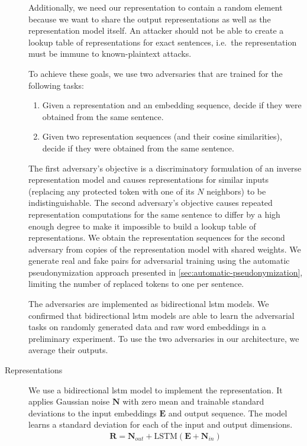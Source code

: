 \begin{description}
    Additionally, we need our representation to contain a random element because we want to share the output representations as well as the representation model itself.
    An attacker should not be able to create a lookup table of representations for exact sentences, i.e.\ the representation must be immune to known-plaintext attacks.
    
    To achieve these goals, we use two adversaries that are trained for the following tasks:
    \begin{enumerate}
        \item Given a representation and an embedding sequence, decide if they were obtained from the same sentence.
        \item Given two representation sequences (and their cosine similarities), decide if they were obtained from the same sentence.
    \end{enumerate}
    
    The first adversary's objective is a discriminatory formulation of an inverse representation model and causes representations for similar inputs (replacing any protected token with one of its $N$ neighbors) to be indistinguishable.
    The second adversary's objective causes repeated representation computations for the same sentence to differ by a high enough degree to make it impossible to build a lookup table of representations.
    We obtain the representation sequences for the second adversary from copies of the representation model with shared weights.
    We generate real and fake pairs for adversarial training using the automatic pseudonymization approach presented in \cref{sec:automatic-pseudonymization}, limiting the number of replaced tokens to one per sentence.
    
    The adversaries are implemented as bidirectional \ac{lstm} models.
    We confirmed that bidirectional \ac{lstm} models are able to learn the adversarial tasks on randomly generated data and raw word embeddings in a preliminary experiment.
    To use the two adversaries in our architecture, we average their outputs.
    
    \item[Representations]
    We use a bidirectional \ac{lstm} model to implement the representation.
    It applies Gaussian noise $\bm{N}$ with zero mean and trainable standard deviations to the input embeddings $\bm{E}$ and output sequence.
    The model learns a standard deviation for each of the input and output dimensions.
    \begin{align}
        \bm{R} = \bm{N}_{out} + \text{LSTM}(\bm{E} + \bm{N}_{in})
    \end{align}
    

\end{description}
